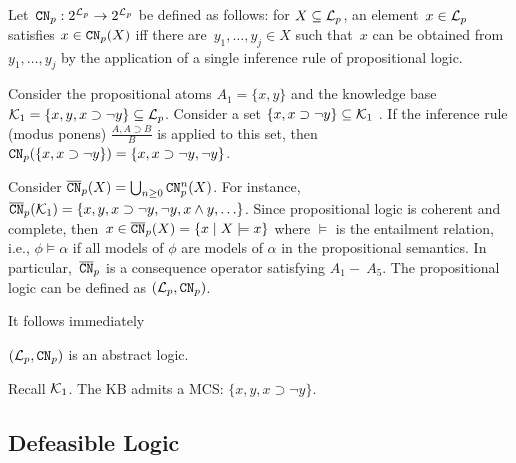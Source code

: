 Let~$\texttt{\textup{CN}}_{p}: 2^ {\mathcal{L}_{p}} \to 2^ {\mathcal{L}_p}$ be defined as follows: for $X \subseteq \mathcal{L}_p$, an element~$x\in \mathcal{L}_p$
satisfies $x\in \texttt{\textup{CN}}_p(X)$ iff there are~$y_1,\ldots,y_j \in X$
such that~$x$ can be obtained from~$y_1,\ldots,y_j$ by the application of a single inference rule of propositional logic.

\begin{example} 
\label{ex:pro-logic}
Consider the propositional atoms $A_1 =\{x, y\}$ and the knowledge base $\mathcal{K}_1 = \{x, y, x \supset \neg y\} \subseteq \mathcal{L}_p$. Consider a set $\{x, x \supset \neg y\} \subseteq \mathcal{K}_1$ .
If the inference rule (modus ponens) $\frac{ A, A \supset B}{B}$ is applied to this set, then $\texttt{\textup{CN}}_{p}(\{x, x \supset \neg y\}) = \{x, x \supset \neg y, \neg y\}$.
\end{example}
Consider $\overline{\texttt{\textup{CN}}}_p(X) = \bigcup_{n \geq 0}\texttt{\textup{CN}}_{p}^{n}(X)$.  For instance, $\overline{\texttt{\textup{CN}}}_{p}(\mathcal{K}_1) = \{x, y, x \supset \neg y, \neg y, x \wedge y, \ldots\}$.
Since propositional logic is coherent and complete, then~$x\in \overline{\texttt{\textup{CN}}}_p(X) = \{x \mid X \models x \}$ where $\models$ is the entailment relation, i.e., $\phi \models \alpha$ if all models of $\phi$ are models of $\alpha$ in the propositional semantics. In particular,~$\overline{\texttt{\textup{CN}}}_{p}$ is a consequence operator  satisfying $A_1 -\ A_5$. The propositional logic can be defined as $(\mathcal{L}_{p} , \texttt{\textup{CN}}_{p})$. 

It follows immediately 

\begin{lemma}
    $(\mathcal{L}_{p} , \texttt{\textup{CN}}_{p})$ is an abstract logic.
\end{lemma}



\begin{example}  Recall $\mathcal{K}_1$. The KB admits a MCS: $\{x, y, x \supset \neg y \}$.
    
\end{example}





\subsection{Defeasible Logic}
\label{subsec:defeasible-logic}

